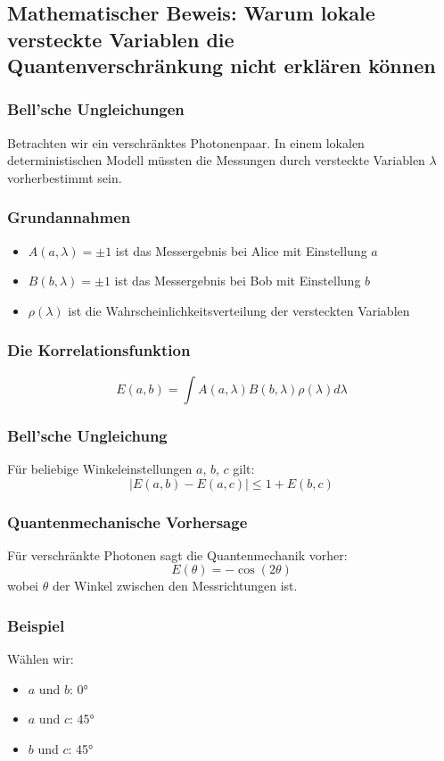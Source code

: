 \documentclass[12pt,a4paper]{article}
\begin{document}
	\subsection{Mathematischer Beweis: Warum lokale versteckte Variablen die Quantenverschränkung nicht erklären können}
	
	\subsubsection{Bell'sche Ungleichungen}
	Betrachten wir ein verschränktes Photonenpaar. In einem lokalen deterministischen Modell müssten die Messungen durch versteckte Variablen \(\lambda\) vorherbestimmt sein.
	
	\subsubsection{Grundannahmen}
	\begin{itemize}
		\item \(A(a,\lambda) = \pm1\) ist das Messergebnis bei Alice mit Einstellung \(a\)
		\item \(B(b,\lambda) = \pm1\) ist das Messergebnis bei Bob mit Einstellung \(b\)
		\item \(\rho(\lambda)\) ist die Wahrscheinlichkeitsverteilung der versteckten Variablen
	\end{itemize}
	
	\subsubsection{Die Korrelationsfunktion}
	\[
	E(a,b) = \int A(a,\lambda)B(b,\lambda)\rho(\lambda)d\lambda
	\]
	
	\subsubsection{Bell'sche Ungleichung}
	Für beliebige Winkeleinstellungen \(a\), \(b\), \(c\) gilt:
	\[
	|E(a,b) - E(a,c)| \leq 1 + E(b,c)
	\]
	
	\subsubsection{Quantenmechanische Vorhersage}
	Für verschränkte Photonen sagt die Quantenmechanik vorher:
	\[
	E(\theta) = -\cos(2\theta)
	\]
	wobei \(\theta\) der Winkel zwischen den Messrichtungen ist.
	
	\subsubsection{Beispiel}
	Wählen wir:
	\begin{itemize}
		\item \(a\) und \(b\): 0°
		\item \(a\) und \(c\): 45°
		\item \(b\) und \(c\): 45°
	\end{itemize}
	
\end{document}
